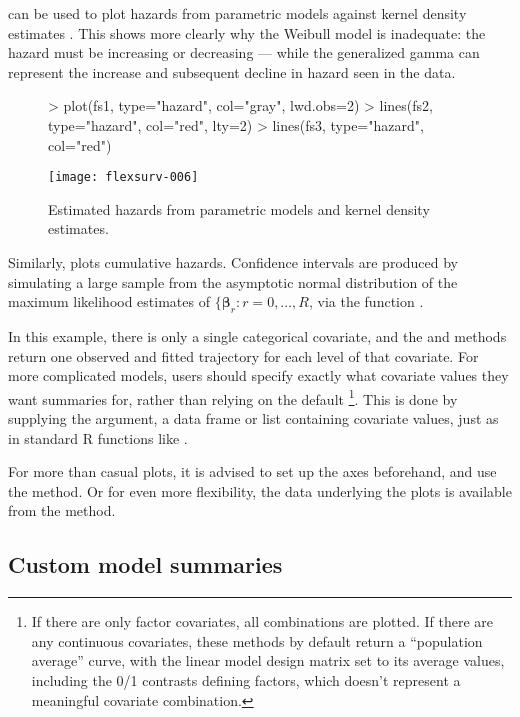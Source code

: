 \documentclass[nojss,nofooter]{jss}
\begin{document}
 can be used to plot hazards from parametric
models against kernel density estimates 
\citep[obtained from ,][]{muhaz,mueller:wang}.  This shows more clearly why the Weibull
model is inadequate: the hazard must be increasing or decreasing ---
while the generalized gamma can represent the increase and subsequent
decline in hazard seen in the data.
\begin{figure}[h]
  \centering
\begin{Schunk}
\begin{Sinput}
> plot(fs1, type="hazard", col="gray", lwd.obs=2)
> lines(fs2, type="hazard", col="red", lty=2)
> lines(fs3, type="hazard", col="red")
\end{Sinput}
\end{Schunk}
\texttt{[image: flexsurv-006]}
  \caption{Estimated hazards from parametric models and kernel density estimates.}
  \label{fig:surv}
\end{figure}

Similarly,  plots cumulative hazards. 
Confidence intervals are produced by simulating a large sample from
the asymptotic normal distribution of the maximum likelihood estimates
of $\{\bm{\beta}_r: r=0,\ldots,R$, via the function
.

In this example, there is only a single categorical covariate, and the
 and  methods return one observed and fitted
trajectory for each level of that covariate.  For more complicated
models, users should specify exactly what covariate values they
want summaries for, rather than relying on the default \footnote{If there are only factor covariates, all combinations are plotted.  If
there are any continuous covariates, these methods by default return a ``population average''
curve, with the linear model design matrix set to its average
values, including the 0/1 contrasts defining factors, which doesn't
represent a meaningful covariate combination.}.
This is done by supplying the  argument, a 
data frame or list containing covariate values, just as
in standard R functions like .

For more than casual plots, it is advised to set up the axes
beforehand, and use the  method.  Or for even more
flexibility, the data underlying the plots is available from the
 method.


\subsection{Custom model summaries}
\end{document}
